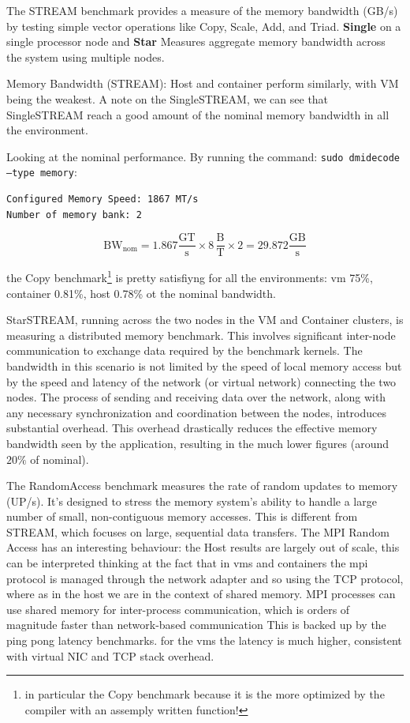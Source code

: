 The STREAM benchmark provides a measure of the memory bandwidth (GB/s) by testing simple vector operations like Copy, Scale, Add, and Triad. \textbf{Single} on a single processor node and \textbf{Star} Measures aggregate memory bandwidth across the system using multiple nodes.

Memory Bandwidth (STREAM): Host and container perform similarly, with VM being the weakest.
A note on the SingleSTREAM, we can see that SingleSTREAM reach a good amount of the nominal memory bandwidth in all the environment.

Looking at the nominal performance. By running the command: \texttt{sudo dmidecode --type memory}:

\begin{verbatim}
Configured Memory Speed: 1867 MT/s
Number of memory bank: 2
\end{verbatim}

\begin{equation*}
    \text{BW}_\text{nom} = 1.867 \frac{\text{GT}}{\text{s}}\times 8\,\frac{\text{B}}{\text{T}}\times 2 = 29.872 \frac{\text{GB}}{\text{s}}
\end{equation*}

the Copy benchmark\footnote{in particular the Copy benchmark because it is the more optimized by the compiler with an assemply written function!} is pretty satisfiyng for all the environments: vm 75\%, container 0.81\%, host 0.78\% ot the nominal bandwidth. 

StarSTREAM, running across the two nodes in the VM and Container clusters, is measuring a distributed memory benchmark. This involves significant inter-node communication to exchange data required by the benchmark kernels. The bandwidth in this scenario is not limited by the speed of local memory access but by the speed and latency of the network (or virtual network) connecting the two nodes. The process of sending and receiving data over the network, along with any necessary synchronization and coordination between the nodes, introduces substantial overhead. This overhead drastically reduces the effective memory bandwidth seen by the application, resulting in the much lower figures (around $20\%$ of nominal).


The RandomAccess benchmark measures the rate of random updates to memory (UP/s). It's designed to stress the memory system's ability to handle a large number of small, non-contiguous memory accesses. This is different from STREAM, which focuses on large, sequential data transfers. 
The MPI Random Access has an interesting behaviour: the Host results are largely out of scale, this can be interpreted thinking at the fact that in vms and containers the mpi protocol is managed through the network adapter and so using the TCP protocol, where as in the host we are in the context of shared memory. MPI processes can use shared memory for inter-process communication, which is orders of magnitude faster than network-based communication This is backed up by the ping pong latency benchmarks. for the vms the latency is much higher, consistent with virtual NIC and TCP stack overhead.

